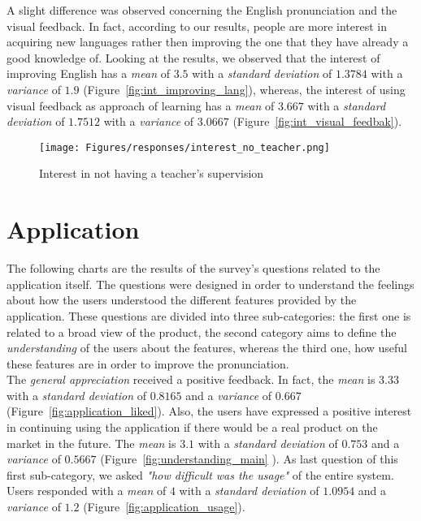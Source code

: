 \noindent A slight difference was observed concerning the English pronunciation and the visual feedback. In fact, according to our results, people are more interest in acquiring new languages rather then improving the one that they have already a good knowledge of. Looking at the results, we observed that the interest of improving English has a \textit{mean} of $3.5$ with a \textit{standard deviation} of $1.3784$ with a \textit{variance} of $1.9$ (Figure~\ref{fig:int_improving_lang}), whereas, the interest of using visual feedback as approach of learning has a \textit{mean} of $3.667$ with a \textit{standard deviation} of $1.7512$ with a \textit{variance} of $3.0667$ (Figure~\ref{fig:int_visual_feedbak}).

\begin{figure}[!ht]
	\centering
	\texttt{[image: Figures/responses/interest\_no\_teacher.png]}
	\caption{Interest in not having a teacher's supervision}
	\label{fig:int_no_teacher}
\end{figure}

\section{Application}
\label{sub:Application}
\noindent The following charts are the results of the survey's questions related to the application itself. The questions were designed in order to understand the feelings about how the users understood the different features provided by the application. These questions are divided into three sub-categories: the first one is related to a broad view of the product, the second category aims to define the \textit{understanding} of the users about the features, whereas the third one, how useful these features are in order to improve the pronunciation. \\

\noindent The \textit{general appreciation} received a positive feedback. In fact, the \textit{mean} is $3.33$ with a \textit{standard deviation} of $0.8165$ and a \textit{variance} of $0.667$ (Figure~\ref{fig:application_liked}). Also, the users have expressed a positive interest in continuing using the application if there would be a real product on the market in the future. The \textit{mean} is $3.1$ with a \textit{standard deviation} of $0.753$ and a \textit{variance} of $0.5667$ (Figure~\ref{fig:understanding_main} ). As last question of this first sub-category, we asked \textit{"how difficult was the usage"} of the entire system. Users responded with a \textit{mean} of $4$ with a \textit{standard deviation} of $1.0954$ and a \textit{variance} of $1.2$ (Figure~\ref{fig:application_usage}).


